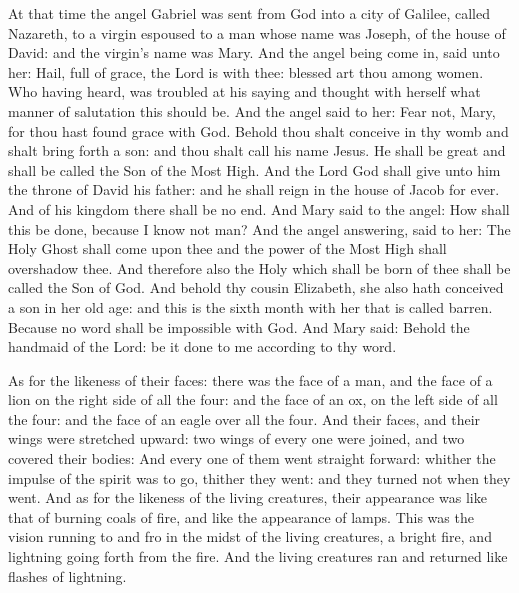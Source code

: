 At that time the angel Gabriel was sent from God into a
city of Galilee, called Nazareth,
to a virgin espoused to a man whose name was Joseph, of the house
of David: and the virgin's name was Mary.
And the angel being come in, said unto her: Hail, full of grace,
the Lord is with thee: blessed art thou among women.
Who having heard, was troubled at his saying and thought with
herself what manner of salutation this should be.
And the angel said to her: Fear not, Mary, for thou hast found
grace with God.
Behold thou shalt conceive in thy womb and shalt bring forth a
son: and thou shalt call his name Jesus.
He shall be great and shall be called the Son of the Most High.
And the Lord God shall give unto him the throne of David his father: and
he shall reign in the house of Jacob for ever.
And of his kingdom there shall be no end.
And Mary said to the angel: How shall this be done, because I know
not man?
And the angel answering, said to her: The Holy Ghost shall come
upon thee and the power of the Most High shall overshadow thee. And
therefore also the Holy which shall be born of thee shall be called the
Son of God.
And behold thy cousin Elizabeth, she also hath conceived a son in
her old age: and this is the sixth month with her that is called barren.
Because no word shall be impossible with God.
And Mary said: Behold the handmaid of the Lord: be it done to me
according to thy word. %

\bigskip



\label{Ep.stmark}

As for the likeness of their faces: there was the face of a
man, and the face of a lion on the right side of all the four: and the
face of an ox, on the left side of all the four: and the face of an
eagle over all the four.
And their faces, and their wings were stretched upward: two wings
of every one were joined, and two covered their bodies:
And every one of them went straight forward: whither the impulse
of the spirit was to go, thither they went: and they turned not when
they went.
And as for the likeness of the living creatures, their appearance
was like that of burning coals of fire, and like the appearance of
lamps. This was the vision running to and fro in the midst of the living
creatures, a bright fire, and lightning going forth from the fire.
And the living creatures ran and returned like flashes of
lightning.


